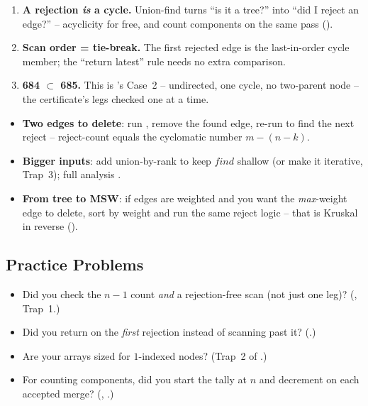\begin{insightbox}
\begin{enumerate}[nosep, leftmargin=1.6em]
  \item \textbf{A rejection \emph{is} a cycle.} Union-find turns ``is it a tree?'' into ``did I reject
        an edge?'' -- acyclicity for free, and count components on the same pass ().
  \item \textbf{Scan order = tie-break.} The first rejected edge is the last-in-order cycle member; the
        ``return latest'' rule needs no extra comparison.
  \item \textbf{684 $\subset$ 685.} This is 's Case~2 -- undirected, one cycle, no
        two-parent node -- the certificate's legs checked one at a time.
\end{enumerate}
\end{insightbox}

\begin{hardeningbox}
\begin{itemize}[nosep, leftmargin=1.4em]
  \item \textbf{Two edges to delete}: run , remove the found edge, re-run to find the
        next reject -- reject-count equals the cyclomatic number $m-(n-k)$.
  \item \textbf{Bigger inputs}: add union-by-rank to keep $\mathit{find}$ shallow (or make it iterative, Trap~3);
        full analysis .
  \item \textbf{From tree to MSW}: if edges are weighted and you want the \emph{max}-weight edge to
        delete, sort by weight and run the same reject logic -- that is Kruskal in reverse ().
\end{itemize}
\end{hardeningbox}

\subsection{Practice Problems}

\begin{stuckbox}
\begin{itemize}[nosep, leftmargin=1.4em]
  \item Did you check the $n-1$ count \emph{and} a rejection-free scan (not just one leg)?
        (, Trap~1.)
  \item Did you return on the \emph{first} rejection instead of scanning past it? (.)
  \item Are your arrays sized for $1$-indexed nodes? (Trap~2 of .)
  \item For counting components, did you start the tally at $n$ and decrement on each accepted merge?
        (, .)
\end{itemize}
\end{stuckbox}

